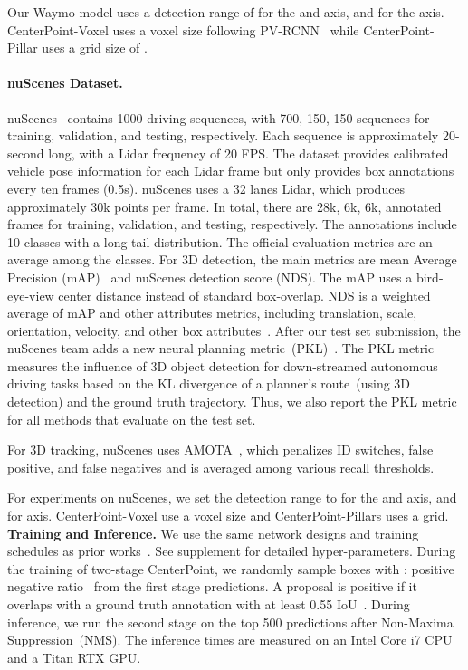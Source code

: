 \documentclass[final]{cvpr}
\begin{document}
Our Waymo model uses a detection range of  for the  and  axis, and  for the  axis. 
CenterPoint-Voxel uses a  voxel size following PV-RCNN~\cite{pvrcnn} while CenterPoint-Pillar uses a grid size of . 

\paragraph{nuScenes Dataset.}
nuScenes~\cite{caesar2019nuscenes} contains 1000 driving sequences, with 700, 150, 150 sequences for training, validation, and testing, respectively.
Each sequence is approximately 20-second long, with a Lidar frequency of 20 FPS.
The dataset provides calibrated vehicle pose information for each Lidar frame but only provides box annotations every ten frames (0.5s).
nuScenes uses a 32 lanes Lidar, which produces approximately 30k points per frame. 
In total, there are 28k, 6k, 6k, annotated frames for training, validation, and testing, respectively.
The annotations include 10 classes with a long-tail distribution. 
The official evaluation metrics are an average among the classes.
For 3D detection, the main metrics are mean Average Precision (mAP)~\cite{everingham2010pascal} and nuScenes detection score (NDS).
The mAP uses a bird-eye-view center distance  instead of standard box-overlap.
NDS is a weighted average of mAP and other attributes metrics, including translation, scale, orientation, velocity, and other box attributes~\cite{caesar2019nuscenes}.
After our test set submission, the nuScenes team adds a new neural planning metric~(PKL)~\cite{philion2020learning}.  
The PKL metric measures the influence of 3D object detection for down-streamed autonomous driving tasks based on the KL divergence of a planner's route~(using 3D detection) and the ground truth trajectory.
Thus, we also report the PKL metric for all methods that evaluate on the test set.

For 3D tracking, nuScenes uses AMOTA~\cite{weng2019baseline}, which penalizes ID switches, false positive, and false negatives and is averaged among various recall thresholds. 

For experiments on nuScenes, we set the detection range to  for the  and  axis, and  for  axis.
CenterPoint-Voxel use a  voxel size and CenterPoint-Pillars uses a  grid. \\ 

\noindent 
\textbf{Training and Inference.}
We use the same network designs and training schedules as prior works~\cite{pvrcnn, zhu2019classbalanced}.
See supplement for detailed hyper-parameters. During the training of two-stage CenterPoint, we randomly sample  boxes with : 
positive negative ratio~\cite{ren2015faster} from the first stage predictions. 
A proposal is positive if it overlaps with a ground truth annotation with at least 0.55 IoU~\cite{pvrcnn}.
During inference, we run the second stage on the top 500 predictions after Non-Maxima Suppression~(NMS).
The inference times are measured on an Intel Core i7 CPU and a Titan RTX GPU.
\end{document}
